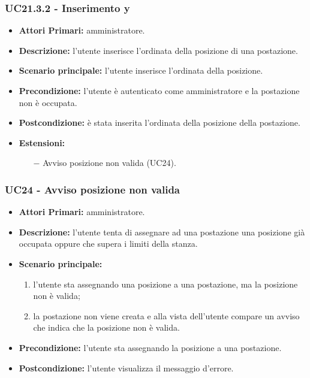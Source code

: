 \subsubsection{ UC21.3.2 - Inserimento y}
\begin{itemize}
	\item\textbf{Attori Primari:}
	amministratore.
	\item\textbf{Descrizione:}
	l'utente inserisce l'ordinata della posizione di una postazione.
	\item\textbf{Scenario principale:} 
	l'utente inserisce l'ordinata della posizione.
	\item\textbf{Precondizione:} 
	l'utente è autenticato come amministratore e la postazione non è occupata.
	\item\textbf{Postcondizione:}
	è stata inserita l'ordinata della posizione della postazione.
	\item\textbf{Estensioni:}
	\begin{itemize}
		\item[$-$] Avviso posizione non valida (UC24).
	\end{itemize}
\end{itemize}

\subsubsection{UC24 - Avviso posizione non valida}
\begin{itemize}
	\item\textbf{Attori Primari:}
	amministratore.
	\item\textbf{Descrizione:}
	l'utente tenta di assegnare ad una postazione una posizione già occupata oppure che supera i limiti della stanza.
	\item\textbf{Scenario principale:}
	\begin{enumerate}
		\item l'utente sta assegnando una posizione a una postazione, ma la posizione non è valida;
		\item la postazione non viene creata e alla vista dell'utente compare un avviso che indica che la posizione non è valida.
	\end{enumerate}
	\item\textbf{Precondizione:}
	l'utente sta assegnando la posizione a una postazione.
	\item\textbf{Postcondizione:}
	l'utente visualizza il messaggio d'errore.
\end{itemize}

